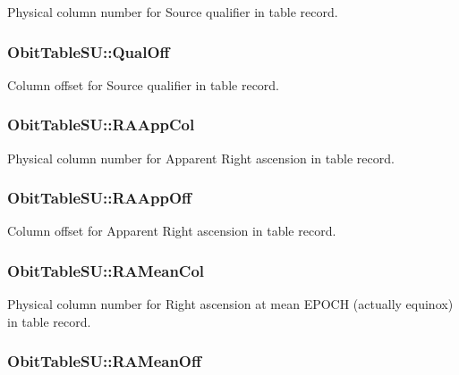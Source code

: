 Physical column number for Source qualifier in table record. 

\subsubsection{ {\bf Obit\-Table\-SU::Qual\-Off}}\label{structObitTableSU_o21}


Column offset for Source qualifier in table record. 

\subsubsection{ {\bf Obit\-Table\-SU::RAApp\-Col}}\label{structObitTableSU_o32}


Physical column number for Apparent Right ascension in table record. 

\subsubsection{ {\bf Obit\-Table\-SU::RAApp\-Off}}\label{structObitTableSU_o31}


Column offset for Apparent Right ascension in table record. 

\subsubsection{ {\bf Obit\-Table\-SU::RAMean\-Col}}\label{structObitTableSU_o26}


Physical column number for Right ascension at mean EPOCH (actually equinox) in table record. 

\subsubsection{ {\bf Obit\-Table\-SU::RAMean\-Off}}\label{structObitTableSU_o25}


